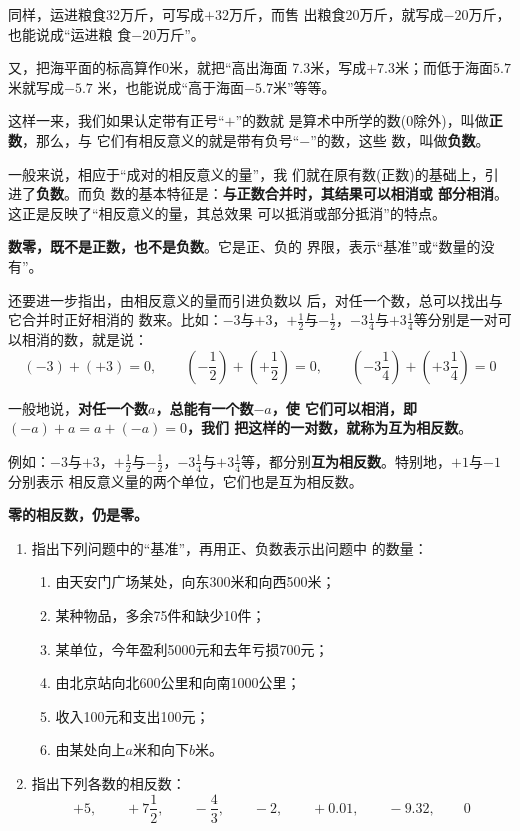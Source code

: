 同样，运进粮食32万斤，可写成$+32$万斤，而售
出粮食20万斤，就写成$-20$万斤，也能说成“运进粮
食$-20$万斤”。

又，把海平面的标高算作0米，就把“高出海面
7.3米，写成$+7. 3$米；而低于海面$5.7$米就写成$-5.7$
米，也能说成“高于海面$-5. 7$米”等等。

这样一来，我们如果认定带有正号“$+$”的数就
是算术中所学的数(0除外)，叫做\textbf{正数}，那么，与
它们有相反意义的就是带有负号“$-$”的数，这些
数，叫做\textbf{负数}。

一般来说，相应于“成对的相反意义的量”，我
们就在原有数(正数)的基础上，引进了\textbf{负数}。而负
数的基本特征是：\textbf{与正数合并时，其结果可以相消或
	部分相消}。这正是反映了“相反意义的量，其总效果
可以抵消或部分抵消”的特点。

\textbf{数零，既不是正数，也不是负数}。它是正、负的
界限，表示“基准”或“数量的没有”。

还要进一步指出，由相反意义的量而引进负数以
后，对任一个数，总可以找出与它合并时正好相消的
数来。比如：$-3$与$+3$，$+\frac{1}{2}$与$-\frac{1}{2}$，$-3\frac{1}{4}$与$+3\frac{1}{4}$等分别是一对可以相消的数，就是说：
\[(-3)+(+3)=0,\qquad \left(-\frac{1}{2}\right)+\left(+\frac{1}{2}\right)=0,\qquad \left(-3\frac{1}{4}\right)+\left(+3\frac{1}{4}\right)=0 \]

一般地说，\textbf{对任一个数$a$，总能有一个数$-a$，使
	它们可以相消，即$(-a) +a=a+ (-a) = 0$，我们
	把这样的一对数，就称为互为相反数}。

例如：$-3$与$+3$，$+\frac{1}{2}$与$-\frac{1}{2}$，$-3\frac{1}{4}$与$+3\frac{1}{4}$等，都分别\textbf{互为相反数}。特别地，$+1$与$-1$分别表示
相反意义量的两个单位，它们也是互为相反数。

\textbf{零的相反数，仍是零。}

\begin{ex}
	\begin{enumerate}
		\item 指出下列问题中的“基准”，再用正、负数表示出问题中
		的数量：
		\begin{enumerate}
			\item 由天安门广场某处，向东300米和向西500米；
			\item 某种物品，多余75件和缺少10件；
			\item 某单位，今年盈利5000元和去年亏损700元；
			\item 由北京站向北600公里和向南1000公里；
			\item 收入100元和支出100元；
			\item 由某处向上$a$米和向下$b$米。
		\end{enumerate}
		
		\item 指出下列各数的相反数：
		\[+5,\qquad +7\frac{1}{2},\qquad -\frac{4}{3},\qquad -2,\qquad +0.01,\qquad -9.32,\qquad 0 \]
	\end{enumerate}   
\end{ex}


